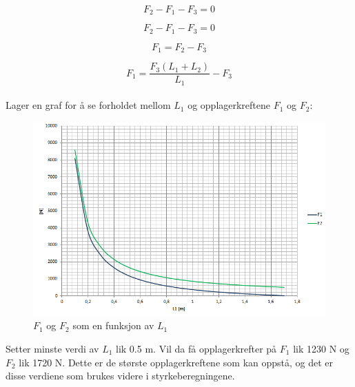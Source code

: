 \begin{equation}
F_2-F_1-F_3=0
\end{equation}

\begin{equation}
F_2-F_1-F_3=0
\end{equation}
 
\begin{equation}
F_1=F_2-F_3
\end{equation}


\begin{equation}
F_1=\frac{F_3(L_1+L_2)}{L_1}-F_3
\end{equation} \\

Lager en graf for å se forholdet mellom $L_1$ og opplagerkreftene $F_1$ og $F_2$:

\begin{figure}[H]
\begin{center}
\leavevmode
\includegraphics[width=1.0\textwidth]{images/Bilden_2}
\end{center}
\caption{$F_1$ og $F_2$ som en funksjon av $L_1$}
\label{fig:Krefter}
\end{figure}

Setter minste verdi av $L_1$ lik 0.5 m. Vil da få opplagerkrefter på $F_1$ lik 1230 N og $F_2$ lik 1720 N. Dette er de største opplagerkreftene som kan oppstå, og det er disse verdiene som brukes videre i styrkeberegningene.


